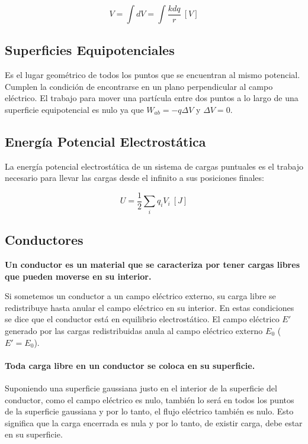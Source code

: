\documentclass{tufte-handout}
\begin{document}
\begin{equation}
V = \int dV = \int \frac{k dq}{r}~[V]
\end{equation}

\subsection{Superficies Equipotenciales}

Es el lugar geométrico de todos los puntos que se encuentran al mismo potencial. Cumplen la condición de encontrarse en un plano perpendicular al campo eléctrico. El trabajo para mover una partícula entre dos puntos a lo largo de una superficie equipotencial es nulo ya que $W_{ab} = -q\Delta V$ y $\Delta V = 0$.

\subsection{Energía Potencial Electrostática}

La energía potencial electrostática de un sistema de cargas puntuales es el trabajo necesario para llevar las cargas desde el infinito a sus posiciones finales:

\begin{equation}
U = \frac{1}{2}\sum_i q_iV_i ~[J]
\end{equation}

\subsection{Conductores}

\textbf{Un conductor es un material que se caracteriza por tener cargas libres que pueden moverse en su interior.}

Si sometemos un conductor a un campo eléctrico externo, su carga libre se redistribuye hasta anular el campo eléctrico en su interior. En estas condiciones se dice que el conductor está en equilibrio electrostático. El campo eléctrico $E'$ generado por las cargas redistribuidas anula al campo eléctrico externo $E_0$ ($E' = E_0$).

\paragraph{Toda carga libre en un conductor se coloca en su superficie. } Suponiendo una superficie gaussiana justo en el interior de la superficie del conductor, como el campo eléctrico es nulo, también lo será en todos los puntos de la superficie gaussiana y por lo tanto, el flujo eléctrico también es nulo. Esto significa que la carga encerrada es nula y por lo tanto, de existir carga, debe estar en su superficie.
\end{document}
